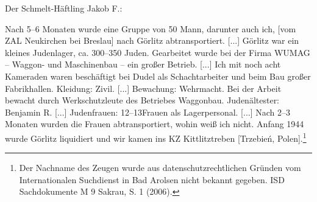 \documentclass[a4paper,12pt,ngerman,
]{nisebook}
\begin{document}
Der Schmelt-Häftling Jakob F.:
\begin{leftbar}
Nach 5--6 Monaten wurde eine Gruppe von 50 Mann, darunter auch ich, [vom ZAL Neukirchen bei Breslau] nach Görlitz abtransportiert. [...] Görlitz war ein kleines Judenlager, ca. 300--350 Juden. Gearbeitet wurde bei der Firma WUMAG -- Waggon- und Maschinenbau -- ein großer Betrieb. [...] Ich mit noch acht Kameraden waren beschäftigt bei Dudel als Schachtarbeiter und beim Bau großer Fabrikhallen. Kleidung: Zivil. [...] Bewachung: Wehrmacht. Bei der Arbeit bewacht durch Werkschutzleute des Betriebes Waggonbau. Judenältester: Benjamin R. [...] Judenfrauen: 12--13Frauen als Lagerpersonal. [...] Nach 2--3 Monaten wurden die Frauen abtransportiert, wohin weiß ich nicht. Anfang 1944 wurde Görlitz liquidiert und wir kamen ins KZ Kittlitztreben [Trzebień, Polen].\footnote{Der Nachname des Zeugen wurde aus datenschutzrechtlichen Gründen vom Internationalen Suchdienst in Bad Arolsen nicht bekannt gegeben. ISD Sachdokumente M 9 Sakrau, S. 1 (2006).}
\end{leftbar}
\end{document}
